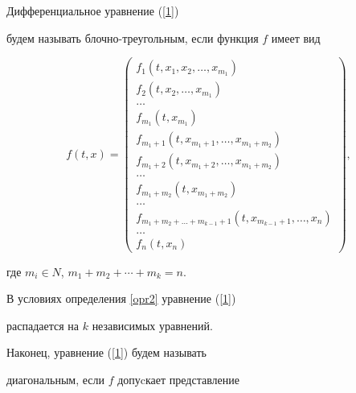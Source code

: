 \begin{defn}


\label{opr2} 


Дифференциальное уравнение (\ref{1})


будем называть блочно-треугольным, если функция $f$ имеет вид


$$


f(t,x)=


\begin{pmatrix}


f_{1}(t,x_{1},x_{2},\dotsc,x_{m_{1}}) \\


f_{2}(t,x_{2},\dotsc,x_{m_{1}}) \\


\dotsc \\


f_{m_{1}}(t,x_{m_{1}}) \\


f_{m_{1}+1}(t,x_{m_{1}+1},\dotsc,x_{m_{1}+m_{2}}) \\


f_{m_{1}+2}(t,x_{m_{1}+2},\dotsc,x_{m_{1}+m_{2}}) \\


\dotsc \\


f_{m_{1}+m_{2}}(t,x_{m_{1}+m_{2}}) \\


\dotsc \\


f_{m_{1}+m_{2}+\dotsc+m_{k-1}+1}(t,x_{m_{k-1}+1},\dotsc,x_{n}) \\


\dotsc \\


f_{n}(t,x_{n})


\end{pmatrix},


$$


где $m_{i}\in N$, $m_{1}+m_{2}+\dotsb+m_{k}=n$.


\end{defn}





В условиях определения \ref{opr2} уравнение (\ref{1})


распадается на $k$ независимых уравнений.





Наконец, уравнение (\ref{1}) будем называть


диагональным, если $f$ допуcкает представление


